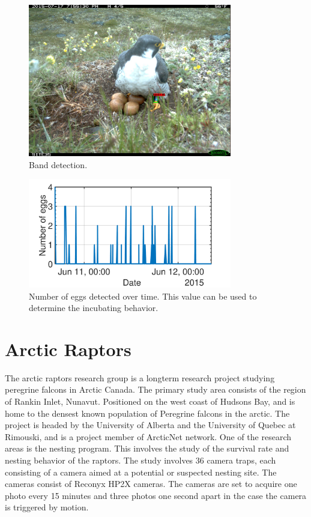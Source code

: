 \documentclass[journal]{IEEEtran}
\begin{document}
\begin{figure}[!tb]
	\centering
	\includegraphics[width=3.5in]{band.jpg}
	\caption{Band detection.}
	\label{band}
\end{figure}

\begin{figure}[!tb]
	\centering
	\includegraphics[width=3.5in]{eggsovertime.pdf}
	\caption{Number of eggs detected over time. This value can be used to determine the incubating behavior.}
	\label{eggsovertime}
\end{figure}

\section{Arctic Raptors}\label{articraptorssection}
The arctic raptors research group is a longterm research project studying peregrine falcons in Arctic Canada. The primary study area consists of the region of Rankin Inlet, Nunavut. Positioned on the west coast of Hudsons Bay, and is home to the densest known population of Peregrine falcons in the arctic. The project is headed by the University of Alberta and the University of Quebec at Rimouski, and is a project member of ArcticNet network. One of the research areas is the nesting program. This involves the study of the survival rate and nesting behavior of the raptors. The study involves 36 camera traps, each consisting of a camera aimed at a potential or suspected nesting site. The cameras consist of Reconyx HP2X cameras. The cameras are set to acquire one photo every 15 minutes and three photos one second apart in the case the camera is triggered by motion. 
\end{document}
